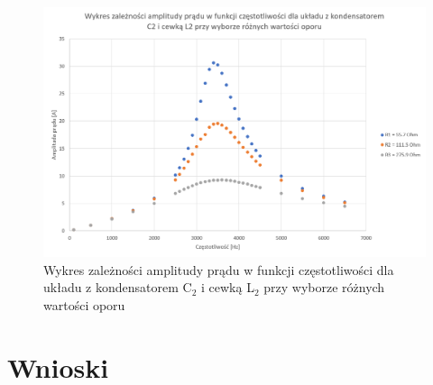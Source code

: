 \documentclass[12pt, a4paper, oneside]{article}
\begin{document}
\clearpage
\begin{figure}[h]
\centering
\caption{Wykres zależności amplitudy prądu w funkcji częstotliwości dla układu z kondensatorem C$_2$ i cewką L$_2$ przy wyborze różnych wartości oporu}
\includegraphics[scale=0.45]{f2.png}
\end{figure}
\section{Wnioski}
\end{document}
